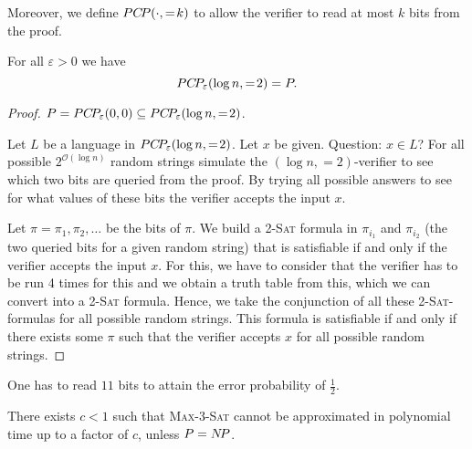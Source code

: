 \documentclass[../skript.tex]{subfiles}
\begin{document}
Moreover, we define $PC \! P(\cdot, = \! k)$ to allow the verifier to read at most $k$ bits from the proof.
\begin{theorem} %
\label{thm:102}
For all $\varepsilon > 0$ we have
\[
	PC \! P_\varepsilon(\log n, = \! 2) = P.
\]
\end{theorem}
\begin{proof}
$P = PC \! P_\varepsilon(0, 0) \subseteq PC \! P_\varepsilon(\log n, = \! 2)$.

Let $L$ be a language in $PC \! P_\varepsilon(\log n, = \! 2)$. Let $x$ be given. Question: $x \in L$?
For all possible $2^{\mathcal{O}(\log n)}$ random strings simulate the $(\log n, = \! 2)$-verifier to see which two bits are queried from the proof.
By trying all possible answers to see for what values of these bits the verifier accepts the input $x$.

Let $\pi = \pi_1, \pi_2, \ldots$ be the bits of $\pi$. We build a \textsc{2-Sat} formula in $\pi_{i_1}$ and $\pi_{i_2}$ (the two queried bits for a given random string) that is satisfiable if and only if the verifier accepts the input $x$. For this, we have to consider that the verifier has to be run 4 times for this and we obtain a truth table from this, which we can convert into a \textsc{2-Sat} formula.
Hence, we take the conjunction of all these \textsc{2-Sat}-formulas for all possible random strings.
This formula is satisfiable if and only if there exists some $\pi$ such that the verifier accepts $x$ for all possible random strings.
\end{proof}
One has to read $11$ bits to attain the error probability of $\frac{1}{2}$.
\begin{theorem} %
\label{thm:103}
There exists $c < 1$ such that \textsc{Max-3-Sat} cannot be approximated in polynomial time up to a factor of $c$, unless $P = N \! P$.
\end{theorem}
\end{document}
